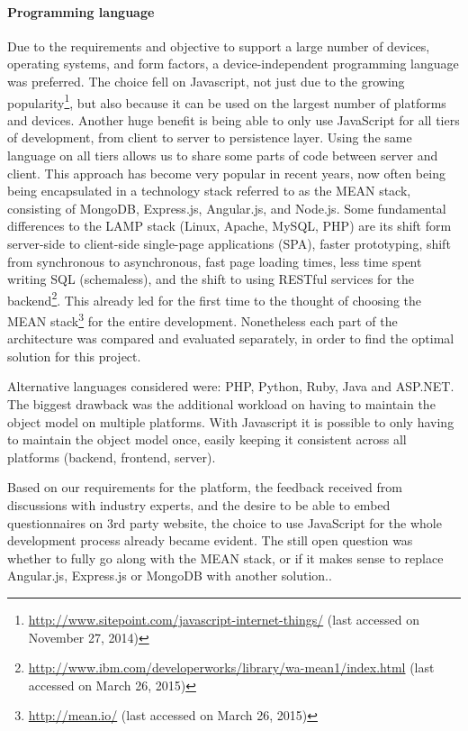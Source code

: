 	\paragraph{Programming language}

		Due to the requirements and objective to support a large number of devices, operating systems, and form factors, a device-independent programming language was preferred. 
		The choice fell on Javascript, not just due to the growing popularity\footnote{\url{http://www.sitepoint.com/javascript-internet-things/} (last accessed on November 27, 2014)}, but also because it can be used on the largest number of platforms and devices. Another huge benefit is being able to only use JavaScript for all tiers of development, from client to server to persistence layer. Using the same language on all tiers allows us to share some parts of code between server and client. This approach has become very popular in recent years, now often being being encapsulated in a technology stack referred to as the MEAN stack, consisting of MongoDB, Express.js, Angular.js, and Node.js. Some fundamental differences to the LAMP stack (Linux, Apache, MySQL, PHP) are its shift form server-side to client-side single-page applications (SPA), faster prototyping, shift from synchronous to asynchronous, fast page loading times, less time spent writing SQL (schemaless), and the shift to using RESTful services for the backend\footnote{\url{http://www.ibm.com/developerworks/library/wa-mean1/index.html} (last accessed on March 26, 2015)}. This already led for the first time to the thought of choosing the MEAN stack\footnote{\url{http://mean.io/} (last accessed on March 26, 2015)} for the entire development. Nonetheless each part of the architecture was compared and evaluated separately, in order to find the optimal solution for this project.

		Alternative languages considered were: PHP, Python, Ruby, Java and ASP.NET. The biggest drawback was the additional workload on having to maintain the object model on multiple platforms. With Javascript it is possible to only having to maintain the object model once, easily keeping it consistent across all platforms (backend, frontend, server).

		Based on our requirements for the platform, the feedback received from discussions with industry experts, and the desire to be able to embed questionnaires on 3rd party website, the choice to use JavaScript for the whole development process already became evident. The still open question was whether to fully go along with the MEAN stack, or if it makes sense to replace Angular.js, Express.js or MongoDB with another solution..


